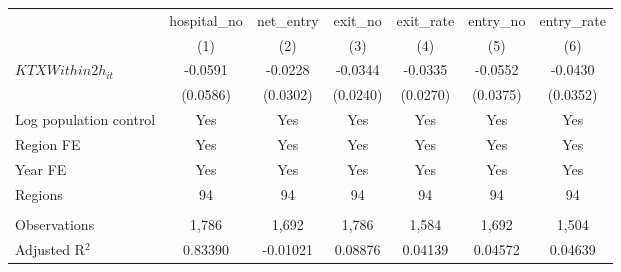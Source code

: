 \begingroup
\centering
\begin{tabular}{lcccccc}
   \toprule
                          & hospital\_no  & net\_entry  & exit\_no  & exit\_rate  & entry\_no  & entry\_rate \\    
                          & (1)           & (2)         & (3)       & (4)         & (5)        & (6)\\  
   \midrule 
   $KTXWithin2h_{it}$     & -0.0591       & -0.0228     & -0.0344   & -0.0335     & -0.0552    & -0.0430\\   
                          & (0.0586)      & (0.0302)    & (0.0240)  & (0.0270)    & (0.0375)   & (0.0352)\\   
   Log population control & Yes           & Yes         & Yes       & Yes         & Yes        & Yes\\  
   Region FE              & Yes           & Yes         & Yes       & Yes         & Yes        & Yes\\  
   Year FE                & Yes           & Yes         & Yes       & Yes         & Yes        & Yes\\  
   Regions                & 94            & 94          & 94        & 94          & 94         & 94\\  
    \\
   Observations           & 1,786         & 1,692       & 1,786     & 1,584       & 1,692      & 1,504\\  
   Adjusted R$^2$         & 0.83390       & -0.01021    & 0.08876   & 0.04139     & 0.04572    & 0.04639\\  
   \bottomrule
\end{tabular}
\par\endgroup

